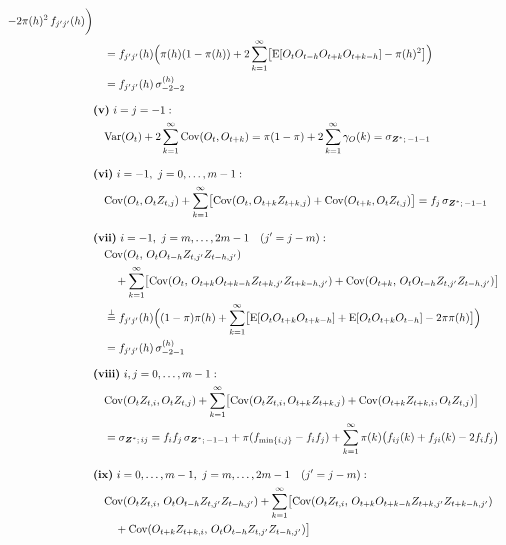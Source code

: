 ﻿\documentclass[12pt,a4paper]{scrreprt}
\theoremstyle{definition}
\begin{document}
{\begin{align*}
 - 2\pi(h)^2\,f_{j'j'}(h) \biggr)\\
&\quad = f_{j'j'}(h)\Bigl(\pi(h)(1-\pi(h)) 
+ 2\sum_{k=1}^{\infty}\bigl[
\mathrm{E}[O_tO_{t-h}O_{t+k}O_{t+k-h}]
- \pi(h)^2\bigr]\Bigr)\\
&\quad = f_{j'j'}(h)\,\sigma^{(h)}_{-2-2}\\[2ex]
%
&\textbf{(v)}\ i = j = -1: \\
&\quad \mathrm{Var}(O_t) + 2\sum_{k=1}^\infty\mathrm{Cov}(O_t, O_{t+k}) 
= \pi(1-\pi) + 2\sum_{k=1}^{\infty}\gamma_O(k)
= \sigma_{\boldsymbol{Z}^*;\,-1-1}\\[2ex]
%
&\textbf{(vi)}\ i = -1,\ j = 0, \ldots, m-1: \\
&\quad \mathrm{Cov}(O_t, O_t Z_{t,j}) 
+ \sum_{k=1}^\infty\bigl[
\mathrm{Cov}(O_t, O_{t+k}Z_{t+k,j}) 
+ \mathrm{Cov}(O_{t+k}, O_tZ_{t,j})\bigr]
= f_j\,\sigma_{\boldsymbol{Z}^*;\,-1-1}\\[2ex]
%
&\textbf{(vii)}\ i = -1,\ j = m, \ldots, 2m-1 \quad  (j'=j-m): \\
&\quad \mathrm{Cov}(O_t,\, O_tO_{t-h}Z_{t,j'}Z_{t-h,j'}) \\
&\qquad + \sum_{k=1}^\infty\bigl[
\mathrm{Cov}(O_t,\, O_{t+k}O_{t+k-h}Z_{t+k, j'}Z_{t+k-h, j'})
 + \mathrm{Cov}(O_{t+k},\, O_tO_{t-h}Z_{t,j'}Z_{t-h,j'})\bigr] \\
&\quad \overset{\perp}{=} 
f_{j'j'}(h)\Bigl((1-\pi)\pi(h)
+ \sum_{k=1}^\infty\bigl[
\mathrm{E}[O_tO_{t+k}O_{t+k-h}] 
+ \mathrm{E}[O_tO_{t+k}O_{t-h}] - 2\pi\pi(h)\bigr]\Bigr)\\
&\quad = f_{j'j'}(h)\,\sigma^{(h)}_{-2-1}\\[2ex]
%
&\textbf{(viii)}\ i,j = 0, \ldots, m-1: \\
&\quad \mathrm{Cov}(O_tZ_{t,i}, O_tZ_{t,j}) 
+ \sum_{k=1}^{\infty}\bigl[
\mathrm{Cov}(O_tZ_{t,i}, O_{t+k}Z_{t+k,j}) 
+ \mathrm{Cov}(O_{t+k}Z_{t+k,i}, O_tZ_{t,j})\bigr] \\
&\quad = \sigma_{\boldsymbol{Z}^*;\,ij} 
= f_i f_j\,\sigma_{\boldsymbol{Z}^*;\,-1 -1} 
+ \pi(f_{\min\{i,j\}}-f_if_j)  
+ \sum_{k=1}^{\infty}\pi(k)\bigl(f_{ij}(k)+f_{ji}(k)-2f_if_j\bigr)\\[2ex]
%
&\textbf{(ix)}\ i = 0, \ldots, m-1,\ j = m, \ldots, 2m-1\quad  (j'=j-m): \\
&\quad \mathrm{Cov}(O_tZ_{t,i},\, O_tO_{t-h}Z_{t,j'}Z_{t-h,j'}) + \sum_{k=1}^{\infty}\bigl[
\mathrm{Cov}(O_tZ_{t,i},\, O_{t+k}O_{t+k-h}Z_{t+k, j'}Z_{t+k-h, j'}) \\
&\qquad + \mathrm{Cov}(O_{t+k}Z_{t+k,i},\, 
O_tO_{t-h}Z_{t,j'}Z_{t-h,j'})\bigr] \\

\end{align*}}
\end{document}
